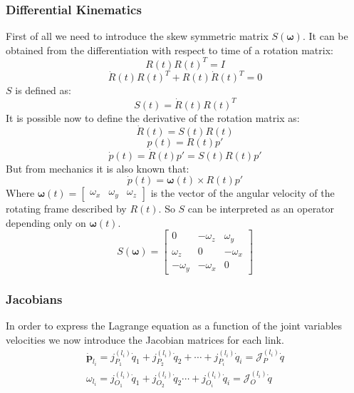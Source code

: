 \subsubsection{Differential Kinematics}
First of all we need to introduce the skew symmetric matrix $S(\boldsymbol{\omega})$. It can be obtained from the differentiation with respect to time of a rotation matrix:
\begin{equation}
	R(t)R(t)^T=I
\end{equation}
\begin{equation}
	\dot{R}(t)R(t)^T+R(t)\dot{R}(t)^T=0
\end{equation}
$S$ is defined as:
\begin{equation}
	S(t) = \dot{R}(t)R(t)^T
\end{equation}
It is possible now to define the derivative of the rotation matrix as:
\begin{equation}
	\dot{R}\left(t\right)=S\left(t\right)R(t)
\end{equation}
\begin{equation}
	p\left(t\right)=R\left(t\right)p'
\end{equation}
\begin{equation}
	\dot{p}\left(t\right)=\dot{R}\left(t\right)p'=S(t)R\left(t\right)p'
\end{equation}
But from mechanics it is also known that:
\begin{equation}
	\dot{p}\left(t\right)=\boldsymbol{\omega}(t)\times R\left(t\right)p'
\end{equation}
Where $\boldsymbol{\omega}\left(t\right)=\left[\begin{matrix}\omega_x&\omega_y&\omega_z\end{matrix}\right]$ is the vector of the angular velocity of the rotating frame described by $R(t)$.
So $S$ can be interpreted as an operator depending only on $\boldsymbol{\omega}\left(t\right)$.
\begin{equation}
	S\left(\boldsymbol{\omega}\right)=\left[
	\begin{matrix}
	0&-\omega_z&\omega_y\\\omega_z&0&-\omega_x\\-\omega_y&{-\omega}_x&0
	\end{matrix}\right]
\end{equation}

\subsubsection{Jacobians}
In order to express the Lagrange equation as a function of the joint variables velocities we now introduce the Jacobian matrices for each link.
\begin{align}
	{\dot{\mathbf{p}}}_{l_i}=\mathit{j}_{P_1}^{(l_i)}{\dot{q}}_1+\mathit{j}_{P_2}^{(l_i)}{\dot{q}}_2+\cdots+\mathit{j}_{P_i}^{\left(l_i\right)}{\dot{q}}_i=\mathcal{J}_P^{(l_i)}\dot{q}
	\\
	\omega_{l_i}=\mathit{j}_{O_1}^{(l_i)}{\dot{q}}_1+\mathit{j}_{O_2}^{(l_i)}{\dot{q}}_2\cdots+\mathit{j}_{O_i}^{\left(l_i\right)}{\dot{q}}_i=\mathcal{J}_O^{(l_i)}\dot{q}
\end{align}

